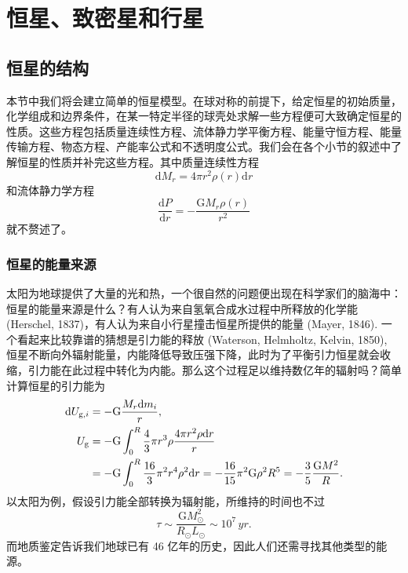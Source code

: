 \documentclass[../天体物理基础.tex]{subfiles}
\begin{document}
\section{恒星、致密星和行星}
\subsection{恒星的结构}
本节中我们将会建立简单的恒星模型。在球对称的前提下，给定恒星的初始质量，化学组成和边界条件，在某一特定半径的球壳处求解一些方程便可大致确定恒星的性质。这些方程包括质量连续性方程、流体静力学平衡方程、能量守恒方程、能量传输方程、物态方程、产能率公式和不透明度公式。我们会在各个小节的叙述中了解恒星的性质并补完这些方程。其中质量连续性方程
\begin{equation}
\mathrm{d}M_{r}=4\pi r^{2}\rho\left(r\right)\mathrm{d}r
\end{equation}
和流体静力学方程
\begin{equation}
\frac{\mathrm{d}P}{\mathrm{d}r}=-\frac{\mathrm{G}M_{r}\rho\left(r\right)}{r^{2}}\label{2.1.2}
\end{equation}
就不赘述了。

\subsubsection{恒星的能量来源}
太阳为地球提供了大量的光和热，一个很自然的问题便出现在科学家们的脑海中：恒星的能量来源是什么？有人认为来自氢氧合成水过程中所释放的化学能 (Herschel, 1837)，有人认为来自小行星撞击恒星所提供的能量 (Mayer, 1846). 一个看起来比较靠谱的猜想是引力能的释放 (Waterson, Helmholtz, Kelvin, 1850), 恒星不断向外辐射能量，内能降低导致压强下降，此时为了平衡引力恒星就会收缩，引力能在此过程中转化为内能。那么这个过程足以维持数亿年的辐射吗？简单计算恒星的引力能为
\begin{align}
\mathrm{d}U_{\text{g},i}&=-\mathrm{G}\frac{M_{r}\mathrm{d}m_{i}}{r},\notag\\
U_{\text{g}}&=-\mathrm{G}\int_{0}^{R}\frac{4}{3}\pi r^{3}\rho \frac{4\pi r^{2}\rho\mathrm{d}r}{r}\notag\\
&=-\mathrm{G}\int_{0}^{R}\frac{16}{3}\pi^{2}r^{4}\rho^{2}\mathrm{d}r=-\frac{16}{15}\pi^{2}\mathrm{G}\rho^{2}R^{5}=-\frac{3}{5}\frac{\mathrm{G}M^{2}}{R}.
\end{align}
以太阳为例，假设引力能全部转换为辐射能，所维持的时间也不过
\begin{equation}
\tau\sim\frac{\mathrm{G}M_{\odot}^{2}}{R_{\odot}L_{\odot}}\sim10^{7}\,\unit{yr}.
\end{equation}
而地质鉴定告诉我们地球已有 46 亿年的历史，因此人们还需寻找其他类型的能源。
\end{document}
